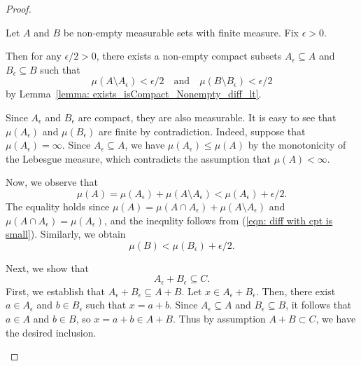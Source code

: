 \begin{proof}
\begin{enumerate}
\begin{enumerate}
            Let \(A\) and \(B\) be non-empty measurable sets with finite measure. 
            Fix \(\epsilon>0\).
            
            Then for any \(\epsilon/2>0\), there exists a non-empty compact subsets \(A_\epsilon \subseteq A\) and \(B_\epsilon \subseteq B\) such that 
            \begin{equation}
                \mu(A \setminus A_\epsilon) < \epsilon/2 \quad \text{and} \quad \mu(B \setminus B_\epsilon) < \epsilon/2
                \label{eqn: diff with cpt is small}
            \end{equation}
            by Lemma~\ref{lemma: exists_isCompact_Nonempty_diff_lt}.
            
            Since \(A_\epsilon\) and \(B_\epsilon\) are compact, they are also measurable. 
            It is easy to see that \(\mu(A_\epsilon)\) and  \(\mu(B_\epsilon)\) are finite by contradiction.
            Indeed, suppose that \(\mu(A_\epsilon) = \infty\). 
            Since \(A_\epsilon \subseteq A\), we have \(\mu(A_\epsilon) \leq \mu(A)\) by the monotonicity of the Lebesgue measure, 
            which contradicts the assumption that \(\mu(A)<\infty\).

            Now, we observe that 
            \begin{equation}
                \mu(A) = \mu(A_\epsilon) + \mu(A \setminus A_\epsilon) < \mu(A_\epsilon) + \epsilon/2.
                \label{eqn: volA bdd by Ae}
            \end{equation}
            The equality holds since \(\mu(A) = \mu(A \cap A_\epsilon) + \mu(A \setminus A_\epsilon)\) and \(\mu(A \cap A_\epsilon) = \mu (A_\epsilon)\), 
            and the inequlity follows from (\ref{eqn: diff with cpt is small}).
            Similarly, we obtain 
            \begin{equation}
                \mu(B) < \mu(B_\epsilon) + \epsilon/2.
                \label{eqn: volB bdd by Be}
            \end{equation}

            
            Next, we show that 
            \begin{equation*}
                A_\epsilon + B_\epsilon \subseteq C.
            \end{equation*}
            First, we establish that \(A_\epsilon + B_\epsilon \subseteq A + B\).
            Let \(x \in A_\epsilon + B_\epsilon\). Then, there exist \(a \in A_\epsilon\) and \(b \in B_\epsilon\) such that \(x = a + b\).
            Since \(A_\epsilon \subseteq A\) and \(B_\epsilon \subseteq B\), it follows that \(a \in A\) and \(b \in B\), 
            so \(x = a + b \in A + B\).
            Thus by assumption \(A + B \subset C\), we have the desired inclusion.
            

\end{enumerate}
\end{enumerate}
\end{proof}
